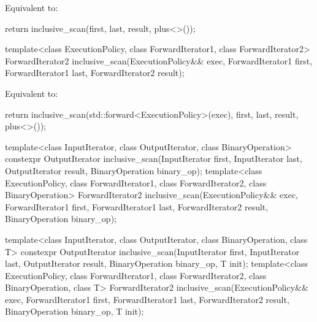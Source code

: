 \begin{itemdescr}
\pnum
\effects
Equivalent to:
\begin{codeblock}
return inclusive_scan(first, last, result, plus<>());
\end{codeblock}
\end{itemdescr}

%
\begin{itemdecl}
template<class ExecutionPolicy, class ForwardIterator1, class ForwardIterator2>
  ForwardIterator2
    inclusive_scan(ExecutionPolicy&& exec,
                   ForwardIterator1 first, ForwardIterator1 last,
                   ForwardIterator2 result);
\end{itemdecl}

\begin{itemdescr}
\pnum
\effects
Equivalent to:
\begin{codeblock}
return inclusive_scan(std::forward<ExecutionPolicy>(exec), first, last, result, plus<>());
\end{codeblock}
\end{itemdescr}

%
\begin{itemdecl}
template<class InputIterator, class OutputIterator, class BinaryOperation>
  constexpr OutputIterator
    inclusive_scan(InputIterator first, InputIterator last,
                   OutputIterator result, BinaryOperation binary_op);
template<class ExecutionPolicy, class ForwardIterator1, class ForwardIterator2,
         class BinaryOperation>
  ForwardIterator2
    inclusive_scan(ExecutionPolicy&& exec,
                   ForwardIterator1 first, ForwardIterator1 last,
                   ForwardIterator2 result, BinaryOperation binary_op);

template<class InputIterator, class OutputIterator, class BinaryOperation, class T>
  constexpr OutputIterator
    inclusive_scan(InputIterator first, InputIterator last,
                   OutputIterator result, BinaryOperation binary_op, T init);
template<class ExecutionPolicy,
         class ForwardIterator1, class ForwardIterator2, class BinaryOperation, class T>
  ForwardIterator2
    inclusive_scan(ExecutionPolicy&& exec,
                   ForwardIterator1 first, ForwardIterator1 last,
                   ForwardIterator2 result, BinaryOperation binary_op, T init);
\end{itemdecl}

